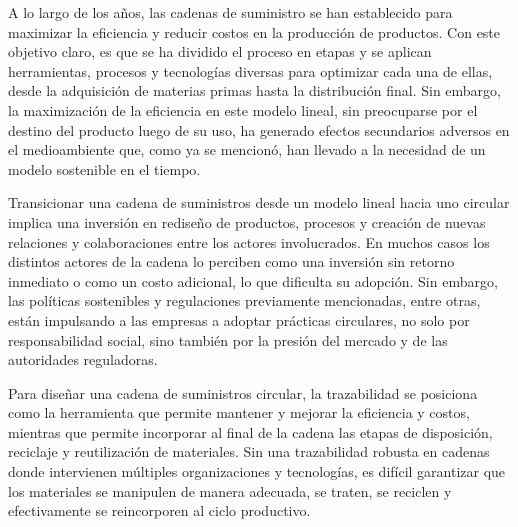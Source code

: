 A lo largo de los años, las cadenas de suministro se han establecido para maximizar la eficiencia y reducir costos en la producción de productos. Con este objetivo claro, es que se ha dividido el proceso en etapas y se aplican herramientas, procesos y tecnologías diversas para optimizar cada una de ellas, desde la adquisición de materias primas hasta la distribución final. Sin embargo, la maximización de la eficiencia en este modelo lineal, sin preocuparse por el destino del producto luego de su uso, ha generado efectos secundarios adversos en el medioambiente que, como ya se mencionó, han llevado a la necesidad de un modelo sostenible en el tiempo.

Transicionar una cadena de suministros desde un modelo lineal hacia uno circular implica una inversión en rediseño de productos, procesos y creación de nuevas relaciones y colaboraciones entre los actores involucrados. En muchos casos los distintos actores de la cadena lo perciben como una inversión sin retorno inmediato o como un costo adicional, lo que dificulta su adopción. Sin embargo, las políticas sostenibles y regulaciones previamente mencionadas, entre otras, están impulsando a las empresas a adoptar prácticas circulares, no solo por responsabilidad social, sino también por la presión del mercado y de las autoridades reguladoras.

Para diseñar una cadena de suministros circular, la trazabilidad se posiciona como la herramienta que permite mantener y mejorar la eficiencia y costos, mientras que permite incorporar al final de la cadena las etapas de disposición, reciclaje y reutilización de materiales. Sin una trazabilidad robusta en cadenas donde intervienen múltiples organizaciones y tecnologías, es difícil garantizar que los materiales se manipulen de manera adecuada, se traten, se reciclen y efectivamente se reincorporen al ciclo productivo.

